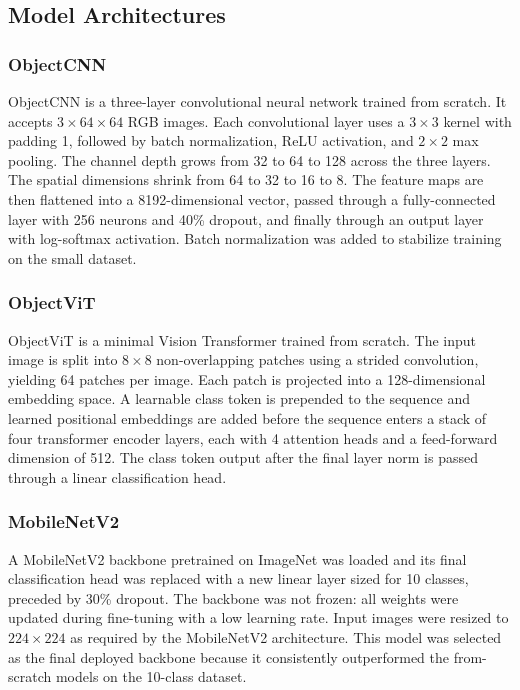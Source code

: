 \documentclass[conference]{IEEEtran}
\begin{document}
\subsection{Model Architectures}

\subsubsection{ObjectCNN}

ObjectCNN is a three-layer convolutional neural network trained from scratch.
It accepts $3 \times 64 \times 64$ RGB images. Each convolutional layer uses a
$3 \times 3$ kernel with padding 1, followed by batch normalization, ReLU
activation, and $2 \times 2$ max pooling. The channel depth grows from 32 to
64 to 128 across the three layers. The spatial dimensions shrink from 64 to 32
to 16 to 8. The feature maps are then flattened into a 8192-dimensional vector,
passed through a fully-connected layer with 256 neurons and 40\% dropout, and
finally through an output layer with log-softmax activation. Batch normalization
was added to stabilize training on the small dataset.

\subsubsection{ObjectViT}

ObjectViT is a minimal Vision Transformer trained from scratch. The input image
is split into $8 \times 8$ non-overlapping patches using a strided convolution,
yielding 64 patches per image. Each patch is projected into a 128-dimensional
embedding space. A learnable class token is prepended to the sequence and
learned positional embeddings are added before the sequence enters a stack of
four transformer encoder layers, each with 4 attention heads and a
feed-forward dimension of 512. The class token output after the final layer
norm is passed through a linear classification head.

\subsubsection{MobileNetV2}

A MobileNetV2 backbone pretrained on ImageNet was loaded and its final
classification head was replaced with a new linear layer sized for 10 classes,
preceded by 30\% dropout. The backbone was not frozen: all weights were updated
during fine-tuning with a low learning rate. Input images were resized to
$224 \times 224$ as required by the MobileNetV2 architecture. This model was
selected as the final deployed backbone because it consistently outperformed
the from-scratch models on the 10-class dataset.
\end{document}

